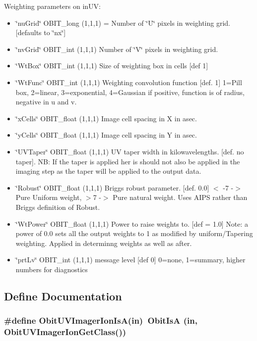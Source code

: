 Weighting parameters on in\-UV: \begin{itemize}
\item \char`\"{}nu\-Grid\char`\"{} OBIT\_\-long (1,1,1) = Number of \char`\"{}U\char`\"{} pixels in weighting grid. [defaults to \char`\"{}nx\char`\"{}] \item \char`\"{}nv\-Grid\char`\"{} OBIT\_\-int (1,1,1) Number of \char`\"{}V\char`\"{} pixels in weighting grid. \item \char`\"{}Wt\-Box\char`\"{} OBIT\_\-int (1,1,1) Size of weighting box in cells [def 1] \item \char`\"{}Wt\-Func\char`\"{} OBIT\_\-int (1,1,1) Weighting convolution function [def. 1] 1=Pill box, 2=linear, 3=exponential, 4=Gaussian if positive, function is of radius, negative in u and v. \item \char`\"{}x\-Cells\char`\"{} OBIT\_\-float (1,1,1) Image cell spacing in X in asec. \item \char`\"{}y\-Cells\char`\"{} OBIT\_\-float (1,1,1) Image cell spacing in Y in asec. \item \char`\"{}UVTaper\char`\"{} OBIT\_\-float (1,1,1) UV taper width in kilowavelengths. [def. no taper]. NB: If the taper is applied her is should not also be applied in the imaging step as the taper will be applied to the output data. \item \char`\"{}Robust\char`\"{} OBIT\_\-float (1,1,1) Briggs robust parameter. [def. 0.0] $<$ -7 -$>$ Pure Uniform weight, $>$7 -$>$ Pure natural weight. Uses AIPS rather than Briggs definition of Robust. \item \char`\"{}Wt\-Power\char`\"{} OBIT\_\-float (1,1,1) Power to raise weights to. [def = 1.0] Note: a power of 0.0 sets all the output weights to 1 as modified by uniform/Tapering weighting. Applied in determinng weights as well as after. \item \char`\"{}prt\-Lv\char`\"{} OBIT\_\-int (1,1,1) message level [def 0] 0=none, 1=summary, higher numbers for diagnostics\end{itemize}


\subsection{Define Documentation}
\subsubsection{\setlength{\rightskip}{0pt plus 5cm}\#define Obit\-UVImager\-Ion\-Is\-A(in)\ Obit\-Is\-A (in, Obit\-UVImager\-Ion\-Get\-Class())}\label{ObitUVImagerIon_8h_a2}


